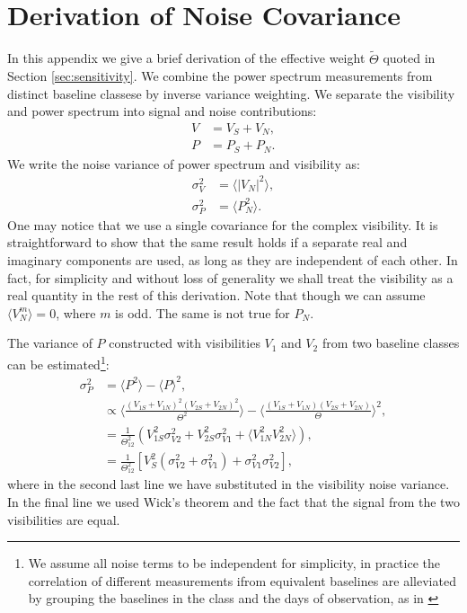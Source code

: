 \documentclass[twocolumn,apj,numberedappendix]{emulateapj}
\renewcommand\[{\begin{equation}}
\renewcommand\]{\end{equation}}
\begin{document}
\section{\label{sec:appB}\\Derivation of Noise Covariance \label{sec:appB}}
\label{sec:appB}
In this appendix we give a brief derivation of the effective weight $\widetilde{\Theta}$ quoted in Section \ref{sec:sensitivity}. We combine the power spectrum measurements from distinct baseline classese by inverse variance weighting. We separate the visibility and power spectrum into signal and noise contributions:
\begin{equation}
\begin{aligned}
V &= V_S+V_N,\\
P &= P_S+P_N.
\end{aligned}
\end{equation}
We write the noise variance of power spectrum and visibility as:
\begin{equation}
\begin{aligned}
\sigma_V^2 &= \langle |V_N|^2 \rangle,\\
\sigma_P^2 &= \langle P_N^2 \rangle.
\end{aligned}
\end{equation}
One may notice that we use a single covariance for the complex visibility. It is straightforward to show that the same result holds if a separate real and imaginary components are used, as long as they are independent of each other. In fact, for simplicity and without loss of generality we shall treat the visibility as a real quantity in the rest of this derivation. 
Note that though we can assume $\langle V_N^{m}\rangle=0$, where $m$ is odd. The same is not true for $P_N$. 

The variance of $P$ constructed with visibilities $V_1$ and $V_2$ from two baseline classes can be estimated\footnote{We assume all noise terms to be independent for simplicity, in practice the correlation of different measurements ifrom equivalent baselines are alleviated by grouping the baselines in the class and the days of observation, as in \cite{Ali2015}}:
\begin{equation}
\begin{aligned}
\sigma_P^2 &= \langle P^2\rangle -\langle P \rangle^2,\\
&\propto \langle \frac{(V_{1S}+V_{1N})^2 (V_{2S}+V_{2N})^2}{\Theta^2} \rangle - \langle \frac{(V_{1S}+V_{1N}) (V_{2S}+V_{2N})}{\Theta} \rangle ^2,\\
&= \frac{1}{\Theta_{12}^2} \left( V_{1S}^2\sigma_{V2}^2+V_{2S}^2\sigma_{V1}^2+\langle V_{1N}^2 V_{2N}^2\rangle\right), \\
&= \frac{1}{\Theta_{12}^2} \left[ V_{S}^2(\sigma_{V2}^2+\sigma_{V1}^2) + \sigma_{V1}^2 \sigma_{V2}^2\right], 
\end{aligned}
\end{equation}
where in the second last line we have substituted in the visibility noise variance. In the final line we used Wick's theorem and the fact that the signal from the two visibilities are equal. 
\end{document}
